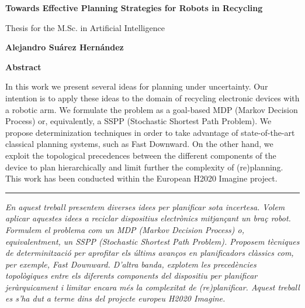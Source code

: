 \documentclass[11pt,a4paper,oldfontcommands,oneside]{memoir}
\begin{document}



\cleardoublepage


\newcommand{\abstractseparation}{0.66cm}
\cleardoublepage

\thispagestyle{plain}
\begin{center}
	\Large
	\textbf{Towards Effective Planning Strategies for Robots in Recycling}
	
	\vspace{0.4cm}
	\large
	Thesis for the M.Sc. in Artificial Intelligence
	
	\vspace{0.4cm}
	\textbf{Alejandro Su\'arez Hern\'andez}
	
	\vspace{0.9cm}
	\textbf{Abstract}
\end{center}

In this work we present several ideas for planning under 
uncertainty. Our intention is to apply these ideas to the domain
of recycling
electronic devices with a robotic arm. We formulate the problem as
a goal-based MDP (Markov Decision Process) or, equivalently, a SSPP
(Stochastic Shortest Path Problem). We propose determinization
techniques in order to take advantage of state-of-the-art
classical planning systems, such as Fast Downward. On the other hand,
we exploit the topological precedences between the different
components of the device to plan hierarchically and limit further
the complexity of (re)planning. This work has been conducted within
the European H2020 Imagine project.

\vspace{\abstractseparation}%
\hrule
\vspace{\abstractseparation}
\noindent
{\itshape
	En aquest treball presentem diverses idees per planificar sota
	incertesa. Volem aplicar aquestes idees a reciclar
	dispositius electr\`onics mitjan\c{c}ant un bra\c{c} robot. Formulem
	el problema com un MDP (Markov Decision Process) o, equivalentment,
	un SSPP (Stochastic Shortest Path Problem). Proposem t\`ecniques
	de determinitzaci\'o per aprofitar els \'ultims avan\c{c}os en
	planificadors cl\`assics com, per exemple, Fast Downward. D'altra banda,
	explotem les preced\`encies topol\`ogiques entre els diferents
	components del dispositiu per planificar jer\`arquicament i
	limitar encara m\'es la complexitat de (re)planificar. Aquest
	treball es s'ha dut a terme dins del projecte europeu H2020 Imagine.
}
\end{document}
